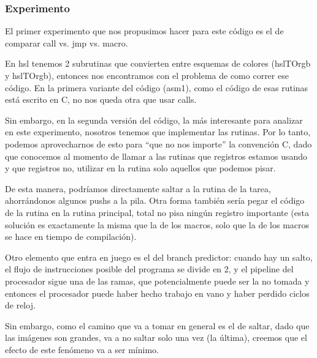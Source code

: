 \subsubsection*{Experimento}
El primer experimento que nos propusimos hacer para este código es el de comparar call vs. jmp vs. macro.

En hsl tenemos 2 subrutinas que convierten entre esquemas de colores (hslTOrgb y hslTOrgb), entonces nos encontramos con el problema de como correr ese código. En la primera variante del código (asm1), como el código de esas rutinas está escrito en C, no nos queda otra que usar calls.

Sin embargo, en la segunda versión del código, la más interesante para analizar en este experimento, nosotros tenemos que implementar las rutinas. Por lo tanto, podemos aprovecharnos de esto para ``que no nos importe'' la convención C, dado que conocemos al momento de llamar a las rutinas que registros estamos usando y que registros no, utilizar en la rutina solo aquellos que podemos pisar.

De esta manera, podríamos directamente saltar a la rutina de la tarea, ahorrándonos algunos pushs a la pila. Otra forma también sería pegar el código de la rutina en la rutina principal, total no pisa ningún registro importante (esta solución es exactamente la misma que la de los macros, solo que la de los macros se hace en tiempo de compilación).

Otro elemento que entra en juego es el del branch predictor: cuando hay un salto, el flujo de instrucciones posible del programa se divide en 2, y el pipeline del procesador sigue una de las ramas, que potencialmente puede ser la no tomada y entonces el procesador puede haber hecho trabajo en vano y haber perdido ciclos de reloj.

Sin embargo, como el camino que va a tomar en general es el de saltar, dado que las imágenes son grandes, va a no saltar solo una vez (la última), creemos que el efecto de este fenómeno va a ser mínimo.

